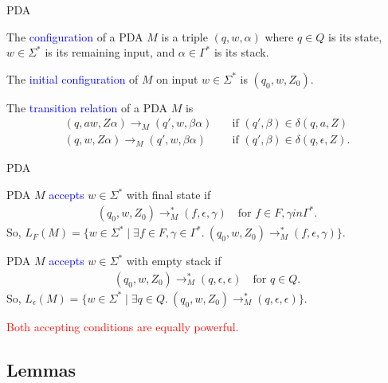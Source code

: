 \documentclass{beamer}
\def\padding{\vspace{0.5cm}}
\def\spadding{\vspace{0.25cm}}
\def\b{\textcolor{blue}}
\def\r{\textcolor{red}}
\begin{document}
\begin{frame}{PDA}
    \begin{definition}
        The \b{configuration} of a PDA $M$ is a triple $(q, w, \alpha)$ where $q \in Q$ is its state, $w \in \Sigma^*$ is its remaining input, and $\alpha \in \Gamma^*$ is its stack.\pause\par\spadding
        The \b{initial configuration} of $M$ on input $w \in \Sigma^*$ is $(q_0,w,Z_0)$.
    \end{definition}\pause
    \begin{definition}
        The \b{transition relation} of a PDA $M$ is \begin{align*}
            (q,aw,Z\alpha) \to_M (q',w,\beta\alpha) &\quad\text{if } (q',\beta) \in \delta(q,a,Z) \\
            (q,w,Z\alpha) \to_M (q',w,\beta\alpha)  &\quad\text{if } (q',\beta) \in \delta(q,\epsilon,Z).
        \end{align*}
    \end{definition}
\end{frame}

\begin{frame}{PDA}
    \begin{definition}
        PDA $M$ \b{accepts} $w \in \Sigma^*$ with final state if \begin{align*}
            (q_0,w,Z_0) \to_M^* (f,\epsilon,\gamma) \quad\text{for } f \in F, \gamma in \Gamma^*.
        \end{align*}
        So, $L_F(M) = \{w \in \Sigma^* \mid \exists f \in F, \gamma \in \Gamma^*.\ (q_0,w,Z_0) \to_M^* (f,\epsilon,\gamma)\}$.
    \end{definition}\pause
    \begin{definition}
        PDA $M$ \b{accepts} $w \in \Sigma^*$ with empty stack if \begin{align*}
            (q_0,w,Z_0) \to_M^* (q,\epsilon,\epsilon) \quad\text{for } q \in Q.
        \end{align*}
        So, $L_{\epsilon}(M) = \{w \in \Sigma^* \mid \exists q \in Q.\ (q_0,w,Z_0) \to_M^* (q,\epsilon,\epsilon)\}$.
    \end{definition}\pause\padding
    \r{Both accepting conditions are equally powerful.}
\end{frame}

\subsection{Lemmas}
\end{document}
